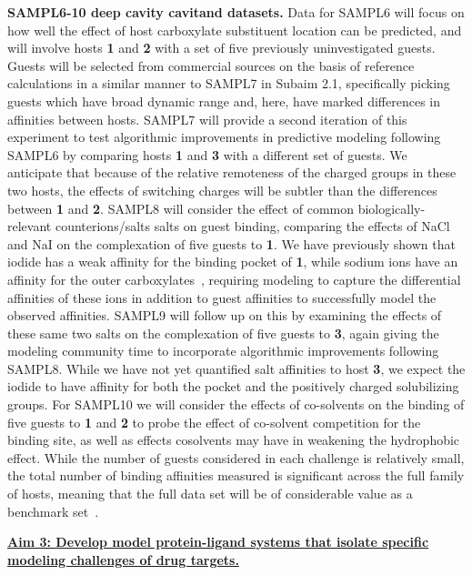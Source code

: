 \documentclass[11pt]{article}
\begin{document}
{\bf SAMPL6-10 deep cavity cavitand datasets.} 
Data for SAMPL6 will focus on how well the effect of host carboxylate substituent location can be predicted, and will involve hosts {\bf 1} and {\bf 2} with a set of five previously uninvestigated guests.  
Guests will be selected from commercial sources on the basis of reference calculations in a similar manner to SAMPL7 in Subaim 2.1, specifically picking guests which have broad dynamic range and, here, have marked differences in affinities between hosts.
SAMPL7 will provide a second iteration of this experiment to test algorithmic improvements in predictive modeling following SAMPL6 by comparing hosts {\bf 1} and {\bf 3} with a different set of guests.  
We anticipate that because of the relative remoteness of the charged groups in these two hosts, the effects of switching charges will be subtler than the differences between {\bf 1} and {\bf 2}.  
SAMPL8 will consider the effect of common biologically-relevant counterions/salts salts on guest binding, comparing the effects of NaCl and NaI on the complexation of five guests to {\bf 1}.  
We have previously shown that iodide has a weak affinity for the binding pocket of {\bf 1}, while sodium ions have an affinity for the outer carboxylates~\cite{carnegie_anion_2014}, requiring modeling to capture the differential affinities of these ions in addition to guest affinities to successfully model the observed affinities.  
SAMPL9 will follow up on this by examining the effects of these same two salts on the complexation of five guests to {\bf 3}, again giving the modeling community time to incorporate algorithmic improvements following SAMPL8. 
While we have not yet quantified salt affinities to host {\bf 3}, we expect the iodide to have affinity for both the pocket and the positively charged solubilizing groups.  
For SAMPL10 we will consider the effects of co-solvents on the binding of five guests to {\bf 1} and {\bf 2} to probe the effect of co-solvent competition for the binding site, as well as effects cosolvents may have in weakening the hydrophobic effect. 
While the number of guests considered in each challenge is relatively small, the total number of binding affinities measured is significant across the full family of hosts, meaning that the full data set will be of considerable value as a benchmark set~\cite{mobley_predicting_2016}. 


\textbf{\underline{Aim 3: Develop model protein-ligand systems that isolate specific modeling challenges of drug targets.}}
\end{document}
